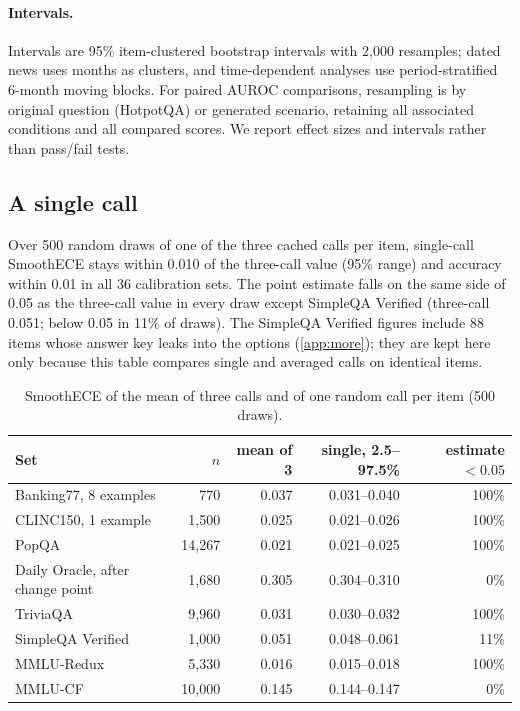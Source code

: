 \documentclass[10pt,twocolumn]{article}
\begin{document}
\paragraph{Intervals.} Intervals are 95\% item-clustered bootstrap
intervals with 2{,}000 resamples; dated news uses months as clusters, and
time-dependent analyses use period-stratified 6-month moving blocks. For
paired AUROC comparisons, resampling is by original question (HotpotQA) or
generated scenario, retaining all associated conditions and all compared
scores. We report effect sizes and intervals rather than pass/fail tests.

\subsection{A single call}
\label{app:single}
Over 500 random draws of one of the three cached calls per item, single-call
SmoothECE stays within 0.010 of the three-call value (95\% range) and accuracy
within 0.01 in all 36 calibration sets. The point estimate falls on the same
side of 0.05 as the three-call value in every draw except SimpleQA Verified
(three-call 0.051; below 0.05 in 11\% of draws). The SimpleQA Verified
figures include 88 items whose answer key leaks into the options
(\cref{app:more}); they are kept here only because this table compares
single and averaged calls on identical items.

\begin{table}[h]
\centering\small
\caption{SmoothECE of the mean of three calls and of one random call per item (500 draws).}
\begin{tabular}{@{}l r r r r@{}}
\toprule
Set & $n$ & mean of 3 & single, 2.5--97.5\% & estimate $<0.05$ \\
\midrule
Banking77, 8 examples & 770 & 0.037 & 0.031--0.040 & 100\% \\
CLINC150, 1 example & 1{,}500 & 0.025 & 0.021--0.026 & 100\% \\
PopQA & 14{,}267 & 0.021 & 0.021--0.025 & 100\% \\
Daily Oracle, after change point & 1{,}680 & 0.305 & 0.304--0.310 & 0\% \\
TriviaQA & 9{,}960 & 0.031 & 0.030--0.032 & 100\% \\
SimpleQA Verified & 1{,}000 & 0.051 & 0.048--0.061 & 11\% \\
MMLU-Redux & 5{,}330 & 0.016 & 0.015--0.018 & 100\% \\
MMLU-CF & 10{,}000 & 0.145 & 0.144--0.147 & 0\% \\
\bottomrule
\end{tabular}
\end{table}
\end{document}
